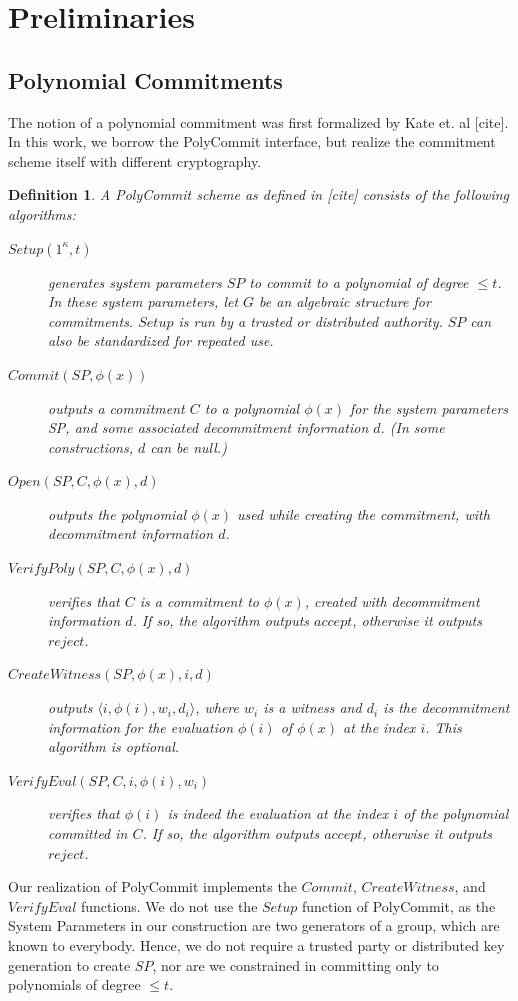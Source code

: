 \documentclass{sig-alternate-05-2015}
\newtheorem{definition}{Definition}
\begin{document}
\section{Preliminaries}
\label{sec:preliminaries}
\subsection{Polynomial Commitments}
The notion of a polynomial commitment was first formalized by Kate et. al [cite]. In this work, we borrow the PolyCommit interface, but realize the commitment scheme itself with different cryptography. \begin{definition} \label{def:PolyCommit}
A {\em PolyCommit} scheme as defined in [cite] consists of the following algorithms:
\begin{description}
\item [$Setup(1^\kappa, t)$] generates system parameters $SP$ to commit to a polynomial of degree $\le t$. 
  In these system parameters, let $G$ be an algebraic structure for commitments. 
  $Setup$ is run by a trusted or distributed authority. $SP$ can also be standardized for repeated  use.
\item [$Commit(SP,\phi(x))$] outputs a commitment $C$ to a polynomial
  $\phi(x)$ for the system parameters SP, and some associated decommitment information $d$.
    (In some constructions, $d$ can be null.)
\item [$Open(SP,C,\phi(x), d)$] outputs the polynomial $\phi(x)$ used
  while creating the commitment, with decommitment information $d$.  
\item [{$VerifyPoly(SP,C,\phi(x), d)$}] verifies that $C$ is a
  commitment to $\phi(x)$, created with decommitment information $d$. If so, the algorithm outputs $accept$,
  otherwise it outputs $reject$.
\item [$CreateWitness(SP,\phi(x),i,d)$] outputs $\langle i,\phi(i),{w}_i, d_i
  \rangle $, where ${w}_i$ is a witness and $d_i$ is the decommitment information for the
  evaluation $\phi(i)$ of $\phi(x)$ at the index $i$. This algorithm is optional.
  \item [$VerifyEval(SP,C, i,\phi(i), w_i)$] verifies that $\phi(i)$ is
  indeed the evaluation at the index $i$ of the polynomial committed in
  $C$. If so, the algorithm outputs $accept$, otherwise it outputs
  $reject$.
\end{description}
\end{definition} 
Our realization of PolyCommit implements the $Commit$, $CreateWitness$, and $VerifyEval$ functions. We do not use the $Setup$ function of PolyCommit, as the System Parameters in our construction are two generators of a group, which are known to everybody. Hence, we do not require a trusted party or distributed key generation to create $SP$, nor are we constrained in committing only to polynomials of degree $\leq t$.
\end{document}
